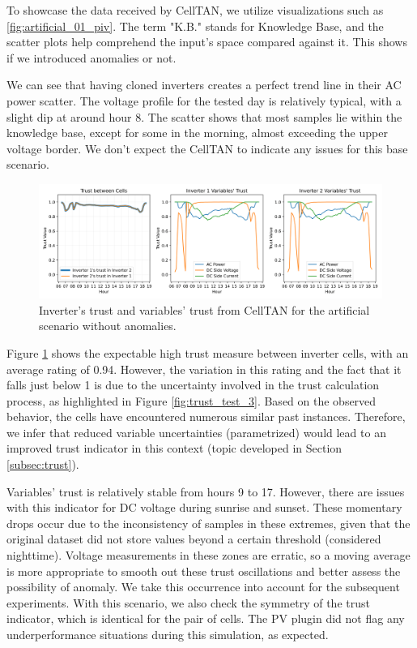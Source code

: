 To showcase the data received by CellTAN, we utilize visualizations such as \ref{fig:artificial_01_piv}. The term "K.B." stands for Knowledge Base, and the scatter plots help comprehend the input's space compared against it. This shows if we introduced anomalies or not.

We can see that having cloned inverters creates a perfect trend line in their AC power scatter. The voltage profile for the tested day is relatively typical, with a slight dip at around hour 8. The scatter shows that most samples lie within the knowledge base, except for some in the morning, almost exceeding the upper voltage border.
We don't expect the CellTAN to indicate any issues for this base scenario.

\begin{figure}[h!]
    \centering
    \includegraphics[width=\linewidth]{figures/chapter5/results/artificial/42_results_test_clone_01-1.png}
    \caption{Inverter's trust and variables' trust from CellTAN for the artificial scenario without anomalies.}
    \label{fig:artificial_results_01}
\end{figure}

Figure \ref{fig:artificial_results_01} shows the expectable high trust measure between inverter cells, with an average rating of 0.94. However, the variation in this rating and the fact that it falls just below 1 is due to the uncertainty involved in the trust calculation process, as highlighted in Figure \ref{fig:trust_test_3}. Based on the observed behavior, the cells have encountered numerous similar past instances. Therefore, we infer that reduced variable uncertainties (parametrized) would lead to an improved trust indicator in this context (topic developed in Section \ref{subsec:trust}).


Variables' trust is relatively stable from hours 9 to 17. However, there are issues with this indicator for DC voltage during sunrise and sunset. These momentary drops occur due to the inconsistency of samples in these extremes, given that the original dataset did not store values beyond a certain threshold (considered nighttime). Voltage measurements in these zones are erratic, so a moving average is more appropriate to smooth out these trust oscillations and better assess the possibility of anomaly. We take this occurrence into account for the subsequent experiments.
With this scenario, we also check the symmetry of the trust indicator, which is identical for the pair of cells. The PV plugin did not flag any underperformance situations during this simulation, as expected.


